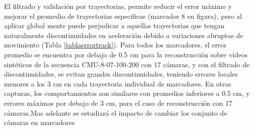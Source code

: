 El filtrado y validación por trayectorias, permite reducir el error máximo y mejorar el promedio de trayectorias especificas (marcador 8 en figura), pero al aplicar global mente puede perjudicar a aquellas trayectorias que tengan naturalmente discontinuidades en aceleración debido a variaciones abruptas de movimiento (Tabla \ref{tablaerrortrack}). Para todos los marcadores, el error promedio se encuentra por debajo de 0.5 cm para la reconstrucción sobre vídeos sintéticos de la secuencia CMU-8-07-100-200 con 17 cámaras, y con el filtrado de discontinuidades, se evitan grandes discontinuidades, teniendo errores locales menores a los 3 cm en cada trayectoria individual de marcadores. En otras capturas, los comportamientos son similares con promedios inferiores a 0.5 cm, y errores máximos por debajo de 3 cm, para el caso de reconstrucción con 17 cámaras.Mas adelante se estudiará el impacto de cambiar los conjunto de cámaras en marcadores   

